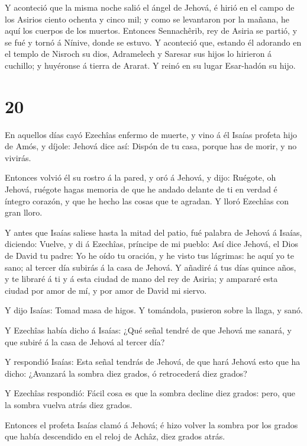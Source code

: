  Y aconteció que la misma noche salió el ángel de Jehová, é
hirió en el campo de los Asirios ciento ochenta y cinco mil; y como se
levantaron por la mañana, he aquí los cuerpos de los muertos.
 Entonces Sennachêrib, rey de Asiria se partió, y se fué y
tornó á Nínive, donde se estuvo.  Y aconteció que, estando
él adorando en el templo de Nisroch su dios, Adramelech y Saresar sus
hijos lo hirieron á cuchillo; y huyéronse á tierra de Ararat. Y reinó en
su lugar Esar-hadón su hijo.

\hypertarget{section-19}{%
\section{20}\label{section-19}}

 En aquellos días cayó Ezechîas enfermo de muerte, y vino á
él Isaías profeta hijo de Amós, y díjole: Jehová dice así: Dispón de tu
casa, porque has de morir, y no vivirás.

 Entonces volvió él su rostro á la pared, y oró á Jehová, y
dijo:  Ruégote, oh Jehová, ruégote hagas memoria de que he
andado delante de ti en verdad é íntegro corazón, y que he hecho las
cosas que te agradan. Y lloró Ezechîas con gran lloro.

 Y antes que Isaías saliese hasta la mitad del patio, fué
palabra de Jehová á Isaías, diciendo:  Vuelve, y di á
Ezechîas, príncipe de mi pueblo: Así dice Jehová, el Dios de David tu
padre: Yo he oído tu oración, y he visto tus lágrimas: he aquí yo te
sano; al tercer día subirás á la casa de Jehová.  Y añadiré
á tus días quince años, y te libraré á ti y á esta ciudad de mano del
rey de Asiria; y ampararé esta ciudad por amor de mí, y por amor de
David mi siervo.

 Y dijo Isaías: Tomad masa de higos. Y tomándola, pusieron
sobre la llaga, y sanó.

 Y Ezechîas había dicho á Isaías: ¿Qué señal tendré de que
Jehová me sanará, y que subiré á la casa de Jehová al tercer día?

 Y respondió Isaías: Esta señal tendrás de Jehová, de que
hará Jehová esto que ha dicho: ¿Avanzará la sombra diez grados, ó
retrocederá diez grados?

 Y Ezechîas respondió: Fácil cosa es que la sombra decline
diez grados: pero, que la sombra vuelva atrás diez grados.

 Entonces el profeta Isaías clamó á Jehová; é hizo volver
la sombra por los grados que había descendido en el reloj de Achâz, diez
grados atrás.

